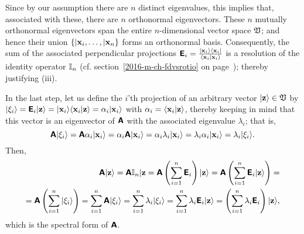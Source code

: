 {Since by our assumption there are $n$ distinct eigenvalues, this implies that, associated with these,
there are $n$ orthonormal eigenvectors.
These $n$ mutually orthonormal eigenvectors
span the entire $n$-dimensional vector space $\frak V$;
and hence their union $\{ \vert {\bf x}_i, \ldots , \vert {\bf x}_n\}$ forms an orthonormal basis.
Consequently, the sum of the associated perpendicular projections
$\textsf{\textbf{E}}_i = \frac{\vert {\bf x}_i \rangle \langle {\bf x}_i \vert}{\langle {\bf x}_i \vert {\bf x}_i  \rangle}$
is a resolution of the identity operator ${\Bbb I}_n$
(cf. section~\ref{2016-m-ch-fdvsrotio} on page~\pageref{2016-m-ch-fdvsrotio}); thereby justifying (iii).

In the last step, let us define the $i$'th projection of an arbitrary vector $\vert {\bf z}\rangle \in \frak V$
by
$
\vert {\xi}_i \rangle =  \textsf{\textbf{E}}_i  \vert  {\bf z} \rangle
=
\vert  {\bf x}_i \rangle \langle  {\bf x}_i   \vert  {\bf z} \rangle
= \alpha_i \vert  {\bf x}_i \rangle
$ with $
\alpha_i = \langle  {\bf x}_i   \vert  {\bf z} \rangle
$,
thereby keeping in mind that this vector
is an eigenvector of $\textsf{\textbf{A}}$  with the associated eigenvalue $\lambda_i$; that is,
\begin{equation}
\textsf{\textbf{A}} \vert {\xi}_i  \rangle
= \textsf{\textbf{A}}\alpha_i \vert  {\bf x}_i \rangle
= \alpha_i \textsf{\textbf{A}} \vert  {\bf x}_i \rangle
= \alpha_i \lambda_i \vert  {\bf x}_i  \rangle
= \lambda_i \alpha_i \vert  {\bf x}_i  \rangle
= \lambda_i \vert {\xi}_i\rangle .
\end{equation}
Then,
\begin{equation}
\begin{split}
\textsf{\textbf{A}} \vert {\bf z} \rangle =
\textsf{\textbf{A}} {\Bbb I}_n \vert {\bf z} =
\textsf{\textbf{A}} \left(\sum_{i=1}^n \textsf{\textbf{E}}_i\right) \vert {\bf z}\rangle  =
\textsf{\textbf{A}} \left(\sum_{i=1}^n \textsf{\textbf{E}}_i \vert {\bf z}\rangle \right) =     \\
=
\textsf{\textbf{A}} \left(\sum_{i=1}^n \vert {\xi}_i\rangle \right) =
 \sum_{i=1}^n \textsf{\textbf{A}} \vert {\xi}_i\rangle   =
 \sum_{i=1}^n \lambda_i \vert {\xi}_i \rangle   =
 \sum_{i=1}^n \lambda_i \textsf{\textbf{E}}_i   \vert {\bf z}\rangle =
\left( \sum_{i=1}^n \lambda_i \textsf{\textbf{E}}_i \right) \vert {\bf z}\rangle ,
\end{split}
\end{equation}
which is the spectral form of $\textsf{\textbf{A}}$.
\eproof
}

